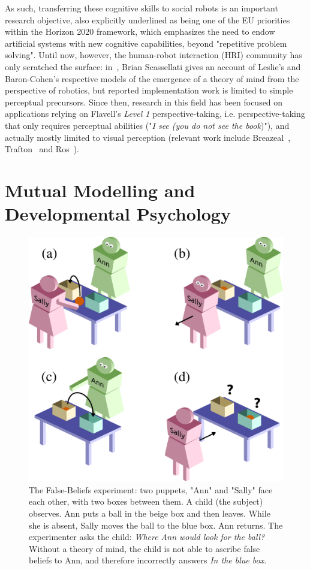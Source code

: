 \documentclass{sig-alternate}
\begin{document}
As such, transferring these cognitive skills to social robots is an important
research objective, also explicitly underlined as being one of the EU priorities
within the Horizon 2020 framework, which emphasizes the need to endow artificial
systems with new cognitive capabilities, beyond "repetitive problem solving".
Until now, however, the human-robot interaction (HRI) community has only
scratched the surface: in~\cite{scassellati2002theory}, Brian Scassellati gives
an account of Leslie's and Baron-Cohen's respective models of the emergence of a
theory of mind from the perspective of robotics, but reported implementation
work is limited to simple perceptual precursors. Since then, research in this
field has been focused on applications relying on Flavell's \emph{Level 1}
perspective-taking, i.e. perspective-taking that only requires perceptual
abilities ("\emph{I see (you do not see the book})"), and actually mostly
limited to visual perception (relevant work include
Breazeal~\cite{Breazeal2006}, Trafton~\cite{Trafton2005} and
Ros~\cite{Ros2010}).


\section{Mutual Modelling and Developmental Psychology}

\begin{figure}[h!t]
        \centering
        \includegraphics[width=0.7\linewidth]{sally_ann}
        \caption{The False-Beliefs experiment: two puppets, "Ann" and "Sally" face each other, with two
    boxes between them. A child (the subject) observes. Ann puts a ball in the
beige box and then leaves. While she is absent, Sally moves the ball to the blue
box. Ann returns. The experimenter asks the child: \emph{Where Ann would look for
the ball?} Without a theory of mind, the child is not able to ascribe false
beliefs to Ann, and therefore incorrectly answers \emph{In the blue box}.}

        \label{false-beliefs}
\end{figure}
\end{document}

